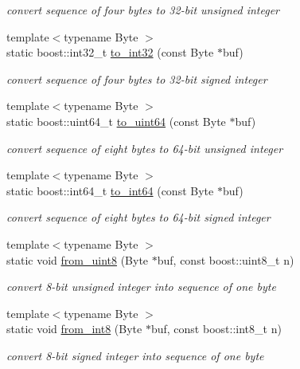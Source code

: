 \begin{DoxyCompactItemize}
\begin{DoxyCompactList}\small\item\em convert sequence of four bytes to 32-\/bit unsigned integer \end{DoxyCompactList}\item 
{\footnotesize template$<$typename Byte $>$ }\\static boost\-::int32\-\_\-t \hyperlink{structpion_1_1algorithm_a1f6f08fd741bd53e2d7ab23d13d557ec}{to\-\_\-int32} (const Byte $\ast$buf)
\begin{DoxyCompactList}\small\item\em convert sequence of four bytes to 32-\/bit signed integer \end{DoxyCompactList}\item 
{\footnotesize template$<$typename Byte $>$ }\\static boost\-::uint64\-\_\-t \hyperlink{structpion_1_1algorithm_a6043289280973a9c81c3f227f7be3558}{to\-\_\-uint64} (const Byte $\ast$buf)
\begin{DoxyCompactList}\small\item\em convert sequence of eight bytes to 64-\/bit unsigned integer \end{DoxyCompactList}\item 
{\footnotesize template$<$typename Byte $>$ }\\static boost\-::int64\-\_\-t \hyperlink{structpion_1_1algorithm_a320eb1084a7f4c6721aa4c5c1f212c76}{to\-\_\-int64} (const Byte $\ast$buf)
\begin{DoxyCompactList}\small\item\em convert sequence of eight bytes to 64-\/bit signed integer \end{DoxyCompactList}\item 
{\footnotesize template$<$typename Byte $>$ }\\static void \hyperlink{structpion_1_1algorithm_a8ef52bc60dfefc940b6fdf5a1dcb5ad7}{from\-\_\-uint8} (Byte $\ast$buf, const boost\-::uint8\-\_\-t n)
\begin{DoxyCompactList}\small\item\em convert 8-\/bit unsigned integer into sequence of one byte \end{DoxyCompactList}\item 
{\footnotesize template$<$typename Byte $>$ }\\static void \hyperlink{structpion_1_1algorithm_aaf784c8b8c422a15929fb1486d3a7282}{from\-\_\-int8} (Byte $\ast$buf, const boost\-::int8\-\_\-t n)
\begin{DoxyCompactList}\small\item\em convert 8-\/bit signed integer into sequence of one byte \end{DoxyCompactList}\item 

\end{DoxyCompactItemize}
